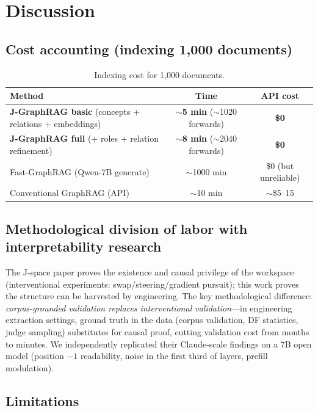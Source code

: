 \section{Discussion}
\label{sec:discussion}

\subsection{Cost accounting (indexing 1{,}000 documents)}

\begin{table}[h]
\centering
\caption{Indexing cost for 1{,}000 documents.}
\label{tab:cost}
\begin{tabular}{@{}lcc@{}}
\toprule
Method & Time & API cost \\
\midrule
\textbf{J-GraphRAG basic} (concepts + relations + embeddings) & \textbf{$\sim$5 min} ($\sim$1020 forwards) & \textbf{\$0} \\
\textbf{J-GraphRAG full} (+ roles + relation refinement) & \textbf{$\sim$8 min} ($\sim$2040 forwards) & \textbf{\$0} \\
Fast-GraphRAG (Qwen-7B generate) & $\sim$1000 min & \$0 (but unreliable) \\
Conventional GraphRAG (API) & $\sim$10 min & $\sim$\$5--15 \\
\bottomrule
\end{tabular}
\end{table}

\subsection{Methodological division of labor with interpretability research}
\label{sec:discussion:methodology}

The J-space paper proves the existence and causal privilege of the workspace
(interventional experiments: swap/steering/gradient pursuit); this work proves
the structure can be harvested by engineering. The key methodological
difference: \emph{corpus-grounded validation replaces interventional
validation}---in engineering extraction settings, ground truth in the data
(corpus validation, DF statistics, judge sampling) substitutes for causal
proof, cutting validation cost from months to minutes. We independently
replicated their Claude-scale findings on a 7B open model (position $-1$
readability, noise in the first third of layers, prefill modulation).

\subsection{Limitations}
\label{sec:discussion:limitations}

